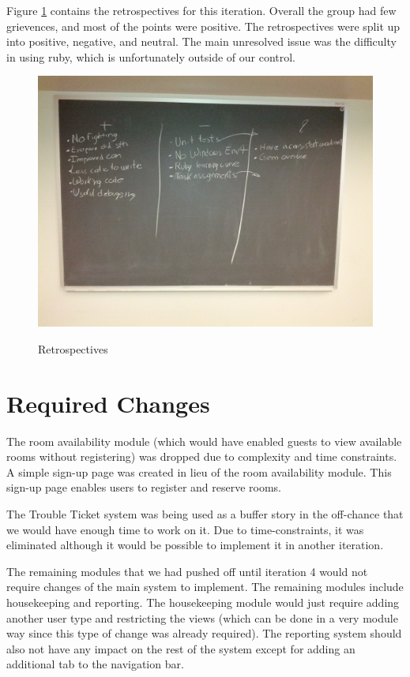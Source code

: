 \documentclass[12pt]{elsarticle}
\begin{document}
Figure \ref{retrospective} contains the retrospectives for this iteration. Overall the group had few grievences, and most of the points were positive. The retrospectives were split up into positive, negative, and neutral. The main unresolved issue was the difficulty in using ruby, which is unfortunately outside of our control.

\begin{figure}[!ht]
	\centering
	\includegraphics[scale=0.15]{images/retrospective}
	\label{retrospective}
	\caption{Retrospectives}
\end{figure}


\section{Required Changes}

The room availability module (which would have enabled guests to view available rooms without registering) was dropped due to complexity and time constraints. A simple sign-up page was created in lieu of the room availability module. This sign-up page enables users to register and reserve rooms. 

The Trouble Ticket system was being used as a buffer story in the off-chance that we would have enough time to work on it. Due to time-constraints, it was eliminated although it would be possible to implement it in another iteration.

The remaining modules that we had pushed off until iteration 4 would not require changes of the main system to implement. The remaining modules include housekeeping and reporting. The housekeeping module would just require adding another user type and restricting the views (which can be done in a very module way since this type of change was already required). The reporting system should also not have any impact on the rest of the system except for adding an additional tab to the navigation bar.
\end{document}

